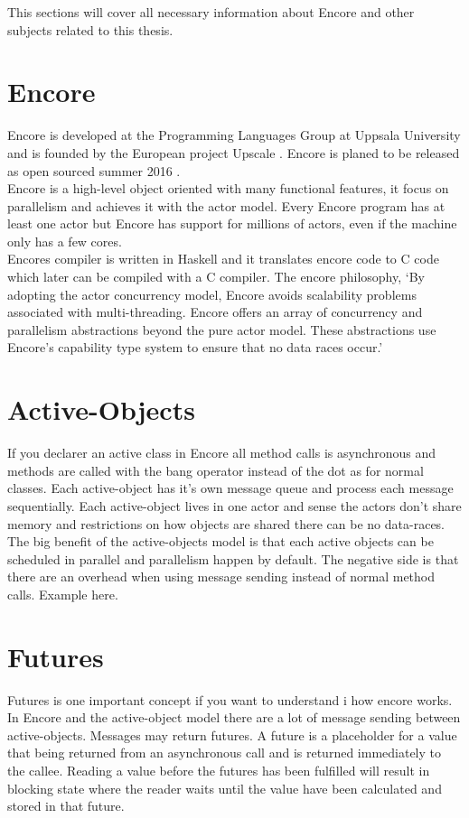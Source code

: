 This sections will cover all necessary information about Encore and other subjects related to this thesis. 
\section{Encore}
Encore is developed at the Programming Languages Group \citep{researchgroup} at Uppsala University  and is founded by the European project Upscale \citep{upscale}.  Encore is planed to be released as open sourced summer 2016 \citep{encore}.\\

Encore is a high-level object oriented with many functional features, it focus on parallelism and achieves it with the actor model. Every Encore program has at least one actor but Encore has support for  millions of actors, even if the machine only has a few cores. \\

Encores compiler is written in Haskell and it translates encore code to C code which later can be compiled with a C compiler. The encore philosophy, ‘By adopting the actor concurrency model, Encore avoids scalability problems associated with multi-threading. Encore offers an array of concurrency and parallelism abstractions beyond the pure actor model. These abstractions use Encore's capability type system to ensure that no data races occur.’ \citep{encore}

\section{Active-Objects}
If you declarer an active class in Encore all method calls is asynchronous and methods are called with the bang operator instead of the dot as for normal classes. Each active-object has it’s own message queue and process each message sequentially. Each active-object lives in one actor and sense the actors don’t share memory and restrictions on how objects are shared there can be no data-races. The big benefit of the active-objects model is that each active objects can be scheduled in parallel and parallelism happen by default. The negative side is that there are an overhead when using message sending instead of normal method calls. 
Example here. 
\section{Futures}
Futures is one important concept if you want to understand i how encore works. In Encore and the active-object model there are a lot  of message sending between active-objects. Messages may return futures. A future is a placeholder for a value that being returned from an asynchronous call and is returned immediately to the callee. Reading a value before the futures has been fulfilled will result in blocking state where the reader waits until the value have been calculated and stored in that future.

